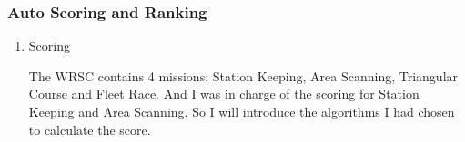 \subsubsection{Auto Scoring and Ranking}
\begin{enumerate}
\item{Scoring}


The WRSC contains 4 missions: Station Keeping, Area Scanning, Triangular Course and Fleet Race. And I was in charge of the scoring for Station Keeping and Area Scanning. So I will introduce the algorithms I had chosen to calculate the score.
\begin{itemize}


\end{itemize} 
\end{enumerate}
